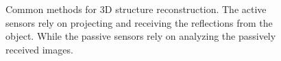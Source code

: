 \begin{figure}[htb!]
  \begin{center}
  \end{center}
  \caption[Common methods for 3D structure reconstruction]{
    Common methods for 3D structure reconstruction. The active sensors rely on projecting and receiving the reflections from the object. While the passive sensors rely on analyzing the passively received images.
  }
  \label{fig:int2}
\end{figure}